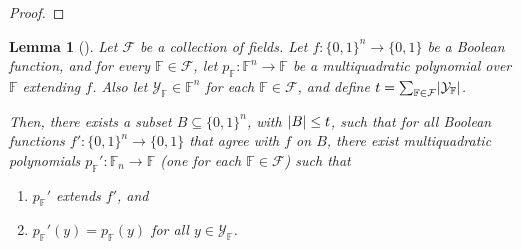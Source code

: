 \documentclass[english,12pt]{reedthesis}
\theoremstyle{plain}
\newtheorem{lemma}[lemma]{Lemma}
\theoremstyle{definition}
\theoremstyle{remark}
\DeclarePairedDelimiter{\abs}{\lvert}{\rvert}
\begin{document}
\begin{proof}
\end{proof}

\begin{lemma}[{\cite[Lemma 4.5]{AW09}}]\label{lem:multiquad-adversary}
  Let $\mathcal{F}$ be a collection of fields. Let $f: \{0, 1\}^{n} \rightarrow \{0, 1\}$ be a
  Boolean function, and for every $\mathbb{F} \in \mathcal{F}$, let
  $p_{\mathbb{F}}: \mathbb{F}^{n} \rightarrow \mathbb{F}$ be a multiquadratic polynomial
  over $\mathbb{F}$ extending $f$. Also let $\mathcal{Y}_{\mathbb{F}} \in \mathbb{F}^{n}$
  for each $\mathbb{F} \in \mathcal{F}$, and define
  $t = \sum_{\mathbb{F} \in \mathcal{F}}\abs{\mathcal{Y}_{\mathbb{F}}}$.

  Then, there exists a subset $B \subseteq \{0, 1\}^{n}$, with $\abs{B} \le t$, such that
  for all Boolean functions $f': \{0, 1\}^{n} \rightarrow \{0, 1\}$ that agree with $f$ on
  $B$, there exist multiquadratic polynomials
  $p_{\mathbb{F}}':\mathbb{F}_{n} \rightarrow \mathbb{F}$ (one for each $\mathbb{F} \in \mathcal{F}$)
  such that
  \begin{enumerate}
    \item $p_{\mathbb{F}}'$ extends $f'$, and
    \item $p_{\mathbb{F}}'(y) = p_{\mathbb{F}}(y)$ for all $y \in \mathcal{Y}_{\mathbb{F}}$.
  \end{enumerate}
\end{lemma}
\end{document}
